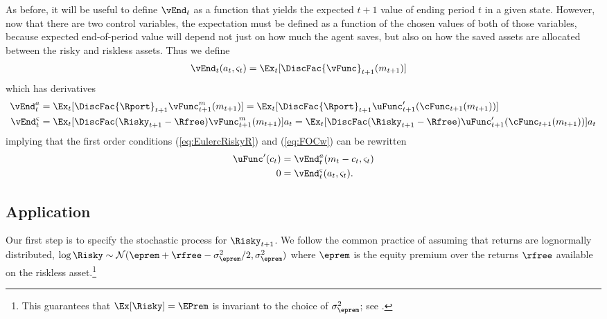 \documentclass[titlepage, headings=optiontotocandhead]{\econtex}
\begin{document}
As before, it will be useful to define $\vEnd_{t}$ as a function that
yields the expected $t+1$ value of ending period $t$ in a given state.
However, now that there are two control variables, the expectation
must be defined as a function of the chosen values of both of those
variables, because expected end-of-period value will depend not just
on how much the agent saves, but also on how the saved assets are
allocated between the risky and riskless assets.  Thus we define
\begin{equation*}\begin{gathered}\begin{aligned}
      \vEnd_{t}({a}_{t},\varsigma_{t})  & = \Ex_{t}[\DiscFac {\vFunc}_{t+1}({m}_{t+1})]
    \end{aligned}\end{gathered}\end{equation*}
which has derivatives
\begin{equation}\begin{gathered}\begin{aligned}
      \vEnd_{t}^{{a}}  & = \Ex_{t}[\DiscFac {\Rport}_{t+1}{\vFunc}_{t+1}^{m}({m}_{t+1})] = \Ex_{t}[\DiscFac {\Rport}_{t+1}{\uFunc}_{t+1}^{\prime}(\cFunc_{t+1}({m}_{t+1}))]
      \\      \vEnd_{t}^{\varsigma}  & = \Ex_{t}[\DiscFac (\Risky_{t+1}-\Rfree){\vFunc}_{t+1}^{m}({m}_{t+1})  ]a_{t} = \Ex_{t}[\DiscFac (\Risky_{t+1}-\Rfree){\uFunc}_{t+1}^{\prime}(\cFunc_{t+1}({m}_{t+1}))  ]a_{t} \notag
    \end{aligned}\end{gathered}\end{equation}
implying that the first order conditions (\ref{eq:EulercRiskyR}) and
(\ref{eq:FOCw}) can be rewritten
\begin{equation}\begin{gathered}\begin{aligned}
      \uFunc^{\prime}({c}_{t})  & = \vEnd_{t}^{{a}}({m}_{t}-{c}_{t},\varsigma_{t})
      \\      0  & = \vEnd^{\varsigma}_{t}({a}_{t},\varsigma_{t}).
    \end{aligned}\end{gathered}\end{equation}

\subsection{Application}

Our first step is to specify the stochastic process for $\Risky_{t+1}$.
We follow the common practice of assuming that returns are
lognormally distributed, $\log \Risky \sim
\mathcal{N}(\eprem+\rfree-\sigma^{2}_{\eprem}/2,\sigma^{2}_{\eprem})$ where $\eprem$ is the equity premium
over the returns $\rfree$ available on the riskless asset.\footnote{This guarantees that $\Ex[\Risky] = \EPrem$ is invariant to the choice of $\sigma^{2}_{\eprem}$; see .}
\end{document}
